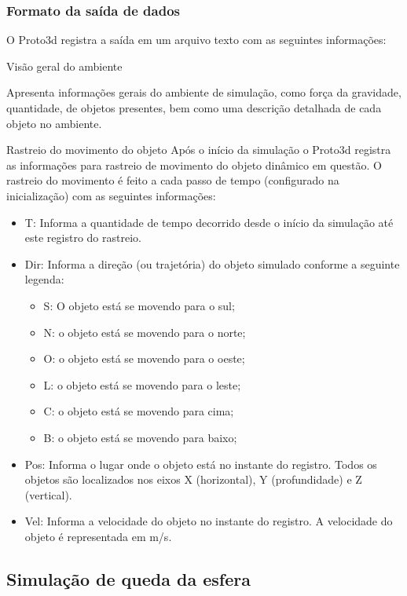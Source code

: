\documentclass[12pt]{article}
\begin{document}
\subsubsection{Formato da saída de dados}
O Proto3d registra a saída em um arquivo texto com as seguintes informações:

Visão geral do ambiente

Apresenta informações gerais do ambiente de simulação, como força da gravidade, quantidade, de objetos presentes, bem como uma descrição detalhada de cada objeto no ambiente. 

Rastreio do movimento do objeto
Após o início da simulação o Proto3d registra as informações para rastreio de movimento do objeto dinâmico em questão. O rastreio do movimento é feito a cada passo de tempo (configurado na inicialização) com as seguintes informações:


\begin{itemize}
\item T: Informa a quantidade de tempo decorrido desde o início da simulação até este registro do rastreio.
\item Dir: Informa a direção (ou trajetória) do objeto simulado conforme a seguinte legenda: 
\begin{itemize}
\item S: O objeto está se movendo para o sul;
\item N: o objeto está se movendo para o norte;
\item O: o objeto está se movendo para o oeste;
\item L: o objeto está se movendo para o leste;
\item C: o objeto está se movendo para cima;
\item B: o objeto está se movendo para baixo;
\end{itemize}

\item Pos: Informa o lugar onde o objeto está no instante do registro. Todos os objetos são localizados nos eixos X (horizontal), Y (profundidade) e Z (vertical).

\item Vel: Informa a velocidade do objeto no instante do registro. A velocidade do objeto é representada em m/s.
\end{itemize}

\subsection{Simulação de queda da esfera }
\end{document}
